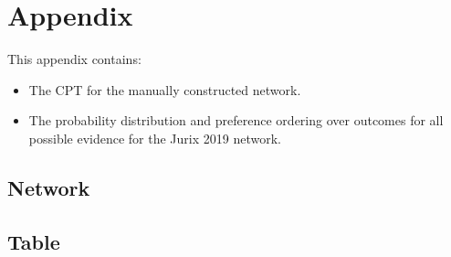 \documentclass[12pt]{article}
\begin{document}



\newpage
\section{Appendix}

This appendix contains:
\begin{itemize}
\item The CPT for the manually constructed network.
\item The probability distribution and preference ordering over outcomes for all possible evidence for the Jurix 2019 network.
\end{itemize}

\subsection{Network}

\subsection{Table}

\end{document}

